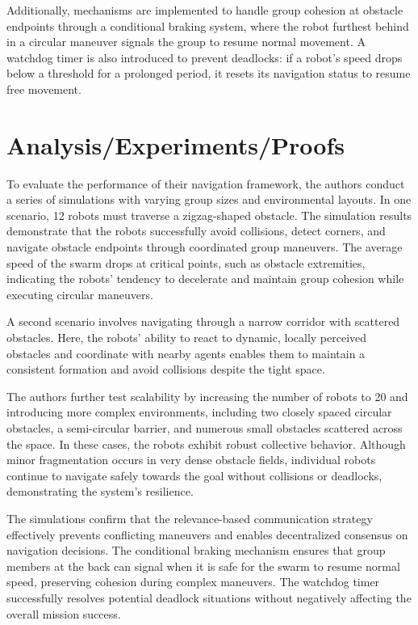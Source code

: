 \documentclass[conference]{IEEEtran}
\begin{document}
Additionally, mechanisms are implemented to handle group cohesion at obstacle endpoints through a conditional braking system, where 
the robot furthest behind in a circular maneuver signals the group to resume normal movement. A watchdog timer is also introduced to 
prevent deadlocks: if a robot's speed drops below a threshold for a prolonged period, it resets its navigation status to resume free movement.


\section{Analysis/Experiments/Proofs}
\cite{Olcay.2020} To evaluate the performance of their navigation framework, the authors conduct a series of simulations with varying 
group sizes and environmental layouts. In one scenario, 12 robots must traverse a zigzag-shaped obstacle. The simulation results 
demonstrate that the robots successfully avoid collisions, detect corners, and navigate obstacle endpoints through coordinated group 
maneuvers. The average speed of the swarm drops at critical points, such as obstacle extremities, indicating the robots' tendency to 
decelerate and maintain group cohesion while executing circular maneuvers.

A second scenario involves navigating through a narrow corridor with scattered obstacles. Here, the robots' ability to react to 
dynamic, locally perceived obstacles and coordinate with nearby agents enables them to maintain a consistent formation and avoid 
collisions despite the tight space.

The authors further test scalability by increasing the number of robots to 20 and introducing more complex environments, including 
two closely spaced circular obstacles, a semi-circular barrier, and numerous small obstacles scattered across the space. In these 
cases, the robots exhibit robust collective behavior. Although minor fragmentation occurs in very dense obstacle fields, individual 
robots continue to navigate safely towards the goal without collisions or deadlocks, demonstrating the system's resilience.

The simulations confirm that the relevance-based communication strategy effectively prevents conflicting maneuvers and enables 
decentralized consensus on navigation decisions. The conditional braking mechanism ensures that group members at the back can signal 
when it is safe for the swarm to resume normal speed, preserving cohesion during complex maneuvers. The watchdog timer successfully 
resolves potential deadlock situations without negatively affecting the overall mission success.
\end{document}
